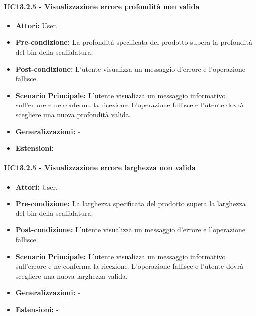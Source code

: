 \paragraph{UC13.2.5 - Visualizzazione errore profondità non valida}
\begin{itemize}
    \item \textbf{Attori:} User.
    \item \textbf{Pre-condizione:} La profondità specificata del prodotto supera la profondità del bin della scaffalatura.
    \item \textbf{Post-condizione:} L'utente visualizza un messaggio d'errore e l'operazione fallisce.
    \item \textbf{Scenario Principale:}  L'utente visualizza un messaggio informativo sull'errore e ne conferma la ricezione. L'operazione fallisce e l'utente dovrà scegliere una nuova profondità valida.
    \item \textbf{Generalizzazioni:} -
    \item \textbf{Estensioni:} -
\end{itemize}


\paragraph{UC13.2.5 - Visualizzazione errore larghezza non valida}
\begin{itemize}
    \item \textbf{Attori:} User.
    \item \textbf{Pre-condizione:}  La larghezza specificata del prodotto supera la larghezza del bin della scaffalatura.
    \item \textbf{Post-condizione:} L'utente visualizza un messaggio d'errore e l'operazione fallisce.
    \item \textbf{Scenario Principale:}  L'utente visualizza un messaggio informativo sull'errore e ne conferma la ricezione. L'operazione fallisce e l'utente dovrà scegliere una nuova larghezza valida.
    \item \textbf{Generalizzazioni:} -
    \item \textbf{Estensioni:} -
\end{itemize}


